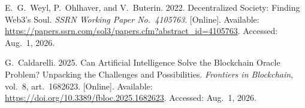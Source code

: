 \documentclass[12pt,a4paper]{report}
\begin{document}
{\begin{enumerate}[label={[\arabic*]}]


\item E.~G.~Weyl, P.~Ohlhaver, and V.~Buterin. 2022. Decentralized Society: Finding Web3's Soul. \emph{SSRN Working Paper No.~4105763}. [Online]. Available: \url{https://papers.ssrn.com/sol3/papers.cfm?abstract_id=4105763}. Accessed: Aug.~1, 2026.


\item G.~Caldarelli. 2025. Can Artificial Intelligence Solve the Blockchain Oracle Problem? Unpacking the Challenges and Possibilities. \emph{Frontiers in Blockchain}, vol.~8, art.~1682623. [Online]. Available: \url{https://doi.org/10.3389/fbloc.2025.1682623}. Accessed: Aug.~1, 2026.




\end{enumerate}}
\end{document}

